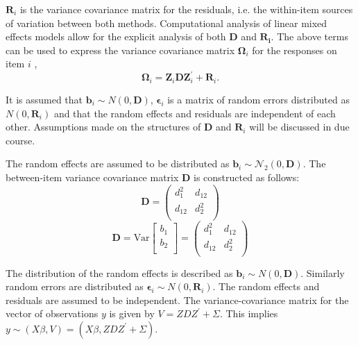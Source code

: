 \documentclass[12pt, a4paper]{report}
\theoremstyle{plain}
\theoremstyle{definition}
\theoremstyle{remark}
\begin{document}
		$\boldsymbol{R}_{i}$ is the variance covariance matrix for the residuals, i.e. the within-item sources of variation between both methods. Computational analysis of linear mixed effects models allow for the explicit analysis of both $\boldsymbol{D}$ and $\boldsymbol{R_i}$.
		The above terms can be used to express the  variance covariance matrix $\boldsymbol{\Omega}_i$ for the responses on item $i$ ,
		\[
		\boldsymbol{\Omega}_i = \boldsymbol{Z}_i \boldsymbol{D} \boldsymbol{Z}_i^{\prime} + \boldsymbol{R}_i.
		\]
		
		It is assumed that $\boldsymbol{b}_i \sim N(0,\boldsymbol{D})$, $\boldsymbol{\epsilon}_i$ is a matrix of random errors distributed as $N(0,\boldsymbol{R}_i)$ and that the random effects and residuals are independent of each other. Assumptions made on the structures of $\boldsymbol{D}$ and $\boldsymbol{R}_i$ will be discussed in due course.
		
		The random effects are assumed to be distributed as $\boldsymbol{b}_i \sim \mathcal{N}_2(0,\boldsymbol{D})$. The between-item variance covariance matrix $\boldsymbol{D}$ is constructed as follows:
		\[ \boldsymbol{D} =\left(
		\begin{array}{cc}
		d^2_1  & d_{12} \\
		d_{12} & d^2_2 \\
		\end{array}
		\right) \]
		\[ \boldsymbol{D} = \mbox{Var}  \left[
		\begin{array}{c}
		b_1   \\
		b_2  \\
		\end{array}
		\right] =  \left(
		\begin{array}{cc}
		d^2_1  & d_{12} \\
		d_{12} & d^2_2 \\
		\end{array}
		\right) \]
		

	
		The distribution of the random effects is described as $\boldsymbol{b}_i \sim N(0,\boldsymbol{D})$. Similarly random errors are distributed as $\boldsymbol{\epsilon}_i \sim N(0,\boldsymbol{R}_i)$. The random effects and residuals are assumed to be independent. The variance-covariance matrix for the vector of observations $y$ is given by $V = ZDZ^{\prime}+ \Sigma.$ This implies $y \sim(X\beta, V) = (X\beta,ZDZ^{\prime}+ \Sigma)$. 
	
\end{document}
